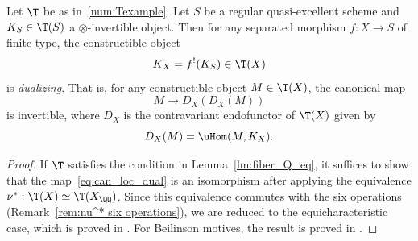 \begin{prop}\label{prop:duality}
Let $\T$ be as in~\ref{num:Texample}.
Let $S$ be a regular quasi-excellent scheme and $K_S \in \T(S)$ a $\otimes$-invertible object.
Then for any separated morphism $f:X\to S$ of finite type, the constructible object
\[K_{X}=f^!(K_S)\in\T(X)\]
is \emph{dualizing}.
That is, for any constructible object $M \in \T(X)$, the canonical map
\begin{equation}\label{eq:can_loc_dual}
M \to D_X(D_X(M))
\end{equation}
is invertible, where $D_X$ is the contravariant endofunctor of $\T(X)$ given by
\[ D_X(M) = \uHom(M, K_X). \]
\end{prop}

\begin{proof}
If $\T$ satisfies the condition in Lemma~\ref{lm:fiber_Q_eq}, it suffices to show that the map~\eqref{eq:can_loc_dual} is an isomorphism after applying the equivalence $\nu^* : \T(X) \simeq \T(X_\QQ)$.
Since this equivalence commutes with the six operations (Remark~\ref{rem:nu^* six operations}), we are reduced to the equicharacteristic case, which is proved in \cite[Th.\,2.4.9]{BD1}. For Beilinson motives, the result is proved in \cite[Th.\,2.3.2]{CisLect}.
\end{proof}

